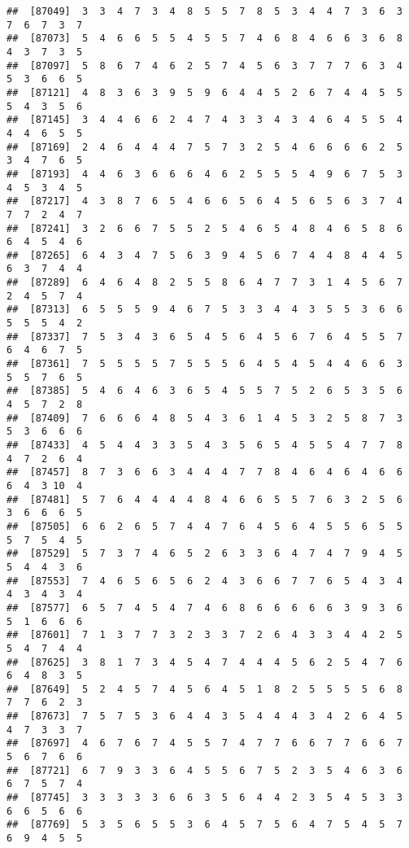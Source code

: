 \documentclass[
]{book}
\begin{document}
\begin{verbatim}
##  [87049]  3  3  4  7  3  4  8  5  5  7  8  5  3  4  4  7  3  6  3  7  6  7  3  7
##  [87073]  5  4  6  6  5  5  4  5  5  7  4  6  8  4  6  6  3  6  8  4  3  7  3  5
##  [87097]  5  8  6  7  4  6  2  5  7  4  5  6  3  7  7  7  6  3  4  5  3  6  6  5
##  [87121]  4  8  3  6  3  9  5  9  6  4  4  5  2  6  7  4  4  5  5  5  4  3  5  6
##  [87145]  3  4  4  6  6  2  4  7  4  3  3  4  3  4  6  4  5  5  4  4  4  6  5  5
##  [87169]  2  4  6  4  4  4  7  5  7  3  2  5  4  6  6  6  6  2  5  3  4  7  6  5
##  [87193]  4  4  6  3  6  6  6  4  6  2  5  5  5  4  9  6  7  5  3  4  5  3  4  5
##  [87217]  4  3  8  7  6  5  4  6  6  5  6  4  5  6  5  6  3  7  4  7  7  2  4  7
##  [87241]  3  2  6  6  7  5  5  2  5  4  6  5  4  8  4  6  5  8  6  6  4  5  4  6
##  [87265]  6  4  3  4  7  5  6  3  9  4  5  6  7  4  4  8  4  4  5  6  3  7  4  4
##  [87289]  6  4  6  4  8  2  5  5  8  6  4  7  7  3  1  4  5  6  7  2  4  5  7  4
##  [87313]  6  5  5  5  9  4  6  7  5  3  3  4  4  3  5  5  3  6  6  5  5  5  4  2
##  [87337]  7  5  3  4  3  6  5  4  5  6  4  5  6  7  6  4  5  5  7  6  4  6  7  5
##  [87361]  7  5  5  5  5  7  5  5  5  6  4  5  4  5  4  4  6  6  3  5  5  7  6  5
##  [87385]  5  4  6  4  6  3  6  5  4  5  5  7  5  2  6  5  3  5  6  4  5  7  2  8
##  [87409]  7  6  6  6  4  8  5  4  3  6  1  4  5  3  2  5  8  7  3  5  3  6  6  6
##  [87433]  4  5  4  4  3  3  5  4  3  5  6  5  4  5  5  4  7  7  8  4  7  2  6  4
##  [87457]  8  7  3  6  6  3  4  4  4  7  7  8  4  6  4  6  4  6  6  6  4  3 10  4
##  [87481]  5  7  6  4  4  4  4  8  4  6  6  5  5  7  6  3  2  5  6  3  6  6  6  5
##  [87505]  6  6  2  6  5  7  4  4  7  6  4  5  6  4  5  5  6  5  5  5  7  5  4  5
##  [87529]  5  7  3  7  4  6  5  2  6  3  3  6  4  7  4  7  9  4  5  5  4  4  3  6
##  [87553]  7  4  6  5  6  5  6  2  4  3  6  6  7  7  6  5  4  3  4  4  3  4  3  4
##  [87577]  6  5  7  4  5  4  7  4  6  8  6  6  6  6  6  3  9  3  6  5  1  6  6  6
##  [87601]  7  1  3  7  7  3  2  3  3  7  2  6  4  3  3  4  4  2  5  5  4  7  4  4
##  [87625]  3  8  1  7  3  4  5  4  7  4  4  4  5  6  2  5  4  7  6  6  4  8  3  5
##  [87649]  5  2  4  5  7  4  5  6  4  5  1  8  2  5  5  5  5  6  8  7  7  6  2  3
##  [87673]  7  5  7  5  3  6  4  4  3  5  4  4  4  3  4  2  6  4  5  4  7  3  3  7
##  [87697]  4  6  7  6  7  4  5  5  7  4  7  7  6  6  7  7  6  6  7  5  6  7  6  6
##  [87721]  6  7  9  3  3  6  4  5  5  6  7  5  2  3  5  4  6  3  6  6  7  5  7  4
##  [87745]  3  3  3  3  3  6  6  3  5  6  4  4  2  3  5  4  5  3  3  6  6  5  6  6
##  [87769]  5  3  5  6  5  5  3  6  4  5  7  5  6  4  7  5  4  5  7  6  9  4  5  5

\end{verbatim}
\end{document}
